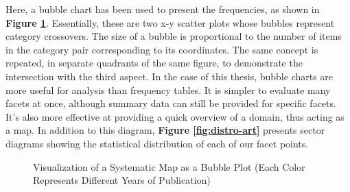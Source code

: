             Here, a bubble chart has been used to present the frequencies, as shown in \textbf{Figure \ref{fig:viz-smb}}. Essentially, these are two x-y scatter plots whose bubbles represent category crossovers. The size of a bubble is proportional to the number of items in the category pair corresponding to its coordinates. The same concept is repeated, in separate quadrants of the same figure, to demonstrate the intersection with the third aspect. In the case of this thesis, bubble charts are more useful for analysis than frequency tables. It is simpler to evaluate many facets at once, although summary data can still be provided for specific facets. It's also more effective at providing a quick overview of a domain, thus acting as a map. In addition to this diagram, \textbf{Figure \ref{fig:distro-art}} presents sector diagrams showing the statistical distribution of each of our facet points.

            
            \begin{figure}[h]
            \centering
            \caption{\label{fig:viz-smb}  Visualization of a Systematic Map as a Bubble Plot (Each Color Represents Different Years of Publication)}
            \end{figure}

